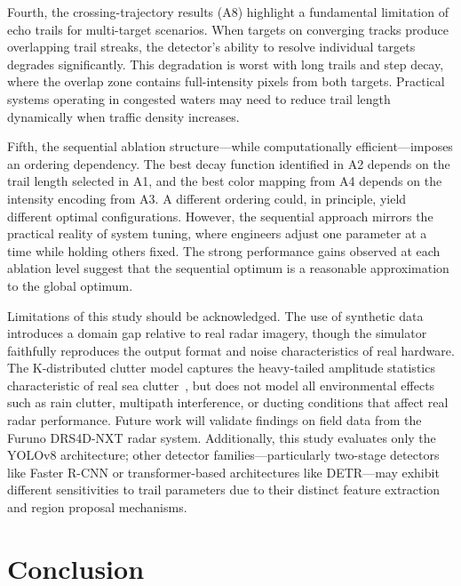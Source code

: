 \documentclass[colorlinks,upint,balance]{asmeconf}
\begin{document}
Fourth, the crossing-trajectory results (A8) highlight a fundamental limitation of echo trails for multi-target scenarios. When targets on converging tracks produce overlapping trail streaks, the detector's ability to resolve individual targets degrades significantly. This degradation is worst with long trails and step decay, where the overlap zone contains full-intensity pixels from both targets. Practical systems operating in congested waters may need to reduce trail length dynamically when traffic density increases.

Fifth, the sequential ablation structure---while computationally efficient---imposes an ordering dependency. The best decay function identified in A2 depends on the trail length selected in A1, and the best color mapping from A4 depends on the intensity encoding from A3. A different ordering could, in principle, yield different optimal configurations. However, the sequential approach mirrors the practical reality of system tuning, where engineers adjust one parameter at a time while holding others fixed. The strong performance gains observed at each ablation level suggest that the sequential optimum is a reasonable approximation to the global optimum.

Limitations of this study should be acknowledged. The use of synthetic data introduces a domain gap relative to real radar imagery, though the simulator faithfully reproduces the output format and noise characteristics of real hardware. The K-distributed clutter model captures the heavy-tailed amplitude statistics characteristic of real sea clutter~\cite{Ward2013Marine}, but does not model all environmental effects such as rain clutter, multipath interference, or ducting conditions that affect real radar performance. Future work will validate findings on field data from the Furuno DRS4D-NXT radar system. Additionally, this study evaluates only the YOLOv8 architecture; other detector families---particularly two-stage detectors like Faster R-CNN or transformer-based architectures like DETR---may exhibit different sensitivities to trail parameters due to their distinct feature extraction and region proposal mechanisms.


\section{Conclusion}
\end{document}
